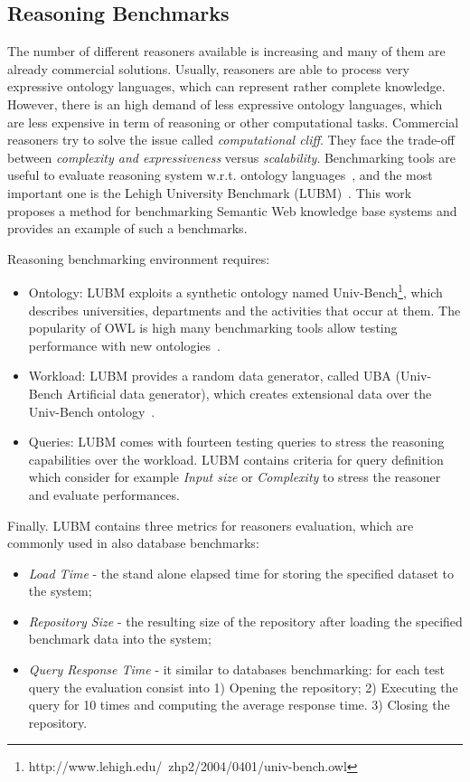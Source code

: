 \subsection{Reasoning Benchmarks}\label{sec:lubm}

The number of different reasoners available is increasing and many of them are already commercial solutions. Usually, reasoners are able to process very expressive ontology languages, which can represent rather complete knowledge. However, there is an high demand of less expressive ontology languages, which are less expensive in term of reasoning or other computational tasks. Commercial reasoners try to solve the issue called \textit{computational cliff}. They face the trade-off between \textit{complexity and expressiveness} versus \textit{scalability}. Benchmarking tools are useful to evaluate reasoning system w.r.t. ontology languages~\cite{bock2008benchmarking}, and the most important one is the Lehigh University Benchmark (LUBM)~\cite{Guo2005}. This work proposes a  method for benchmarking Semantic Web knowledge base systems and provides an example of such a benchmarks.

Reasoning benchmarking environment requires:
\begin{itemize}
\item Ontology: LUBM exploits a synthetic ontology named Univ-Bench\footnote{http://www.lehigh.edu/~zhp2/2004/0401/univ-bench.owl}, which describes universities, departments and the activities that occur at them. The popularity of OWL is high many benchmarking tools allow testing performance with new ontologies~\cite{gardiner2006automated}.

\item Workload: LUBM provides a random data generator, called UBA (Univ-Bench Artificial data generator), which creates extensional data over the Univ-Bench ontology~\cite{Guo2005}.

\item Queries: LUBM comes with fourteen testing queries to stress the reasoning capabilities over the workload. LUBM contains criteria for query definition which consider for example \textit{Input size} or \textit{Complexity} to stress the reasoner and evaluate performances.
\end{itemize}

Finally. LUBM contains three metrics for reasoners evaluation, which are commonly used in also database benchmarks:
\begin{itemize}
\item \textit{Load Time} - the stand alone elapsed time for storing the specified dataset to the system;
\item \textit{Repository Size} -  the resulting size of the repository after loading the specified benchmark data into the system;
\item \textit{Query Response Time} - it similar to databases benchmarking: for each test query the evaluation consist into
  	1) Opening the repository; 2) Executing the query for 10 times and computing the average response time. 3) Closing the repository.
\end{itemize}


